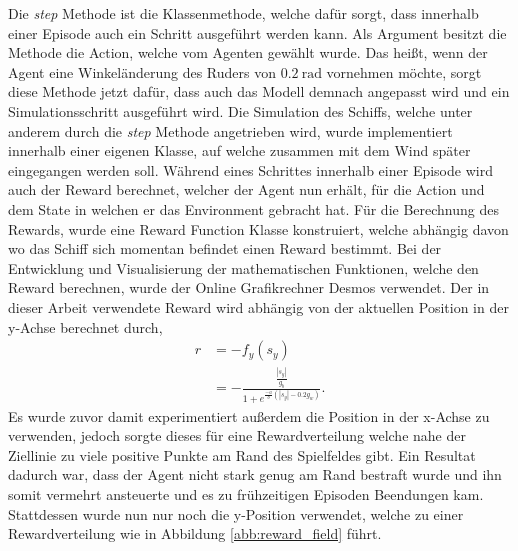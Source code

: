\documentclass[]{iat}
\begin{document}
Die \textit{step} Methode ist die Klassenmethode, welche dafür sorgt, dass innerhalb einer Episode auch ein Schritt ausgeführt werden kann. Als Argument besitzt die Methode die Action, welche vom Agenten gewählt wurde. Das heißt, wenn der Agent eine Winkeländerung des Ruders von $\SI{0.2}{\radian}$ vornehmen möchte, sorgt diese Methode jetzt dafür, dass auch das Modell demnach angepasst wird und ein Simulationsschritt ausgeführt wird. Die Simulation des Schiffs, welche unter anderem durch die \textit{step} Methode angetrieben wird, wurde implementiert innerhalb einer eigenen Klasse, auf welche zusammen mit dem Wind später eingegangen werden soll. Während eines Schrittes innerhalb einer Episode wird auch der Reward berechnet, welcher der Agent nun erhält, für die Action und dem State in welchen er das Environment gebracht hat. Für die Berechnung des Rewards, wurde eine Reward Function Klasse konstruiert, welche abhängig davon wo das Schiff sich momentan befindet einen Reward bestimmt. Bei der Entwicklung und Visualisierung der mathematischen Funktionen, welche den Reward berechnen, wurde der Online Grafikrechner Desmos \cite[]{desmos} verwendet. Der in dieser Arbeit verwendete Reward wird abhängig von der aktuellen Position in der y-Achse berechnet durch,
\begin{align}
    r & = -f_y(s_y)                                                          \\
      & = - \frac{\frac{|s_y|}{g_b}}{1 + e^{\frac{-a}{b}(|s_y| - 0.2 g_w)}}.
\end{align}
Es wurde zuvor damit experimentiert außerdem die Position in der x-Achse zu verwenden, jedoch sorgte dieses für eine Rewardverteilung welche nahe der Ziellinie zu viele positive Punkte am Rand des Spielfeldes gibt. Ein Resultat dadurch war, dass der Agent nicht stark genug am Rand bestraft wurde und ihn somit vermehrt ansteuerte und es zu frühzeitigen Episoden Beendungen kam. Stattdessen wurde nun nur noch die y-Position verwendet, welche zu einer Rewardverteilung wie in Abbildung \ref{abb:reward_field} führt.
\end{document}

